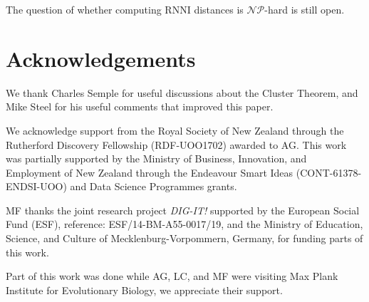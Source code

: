 \documentclass{amsart}
\newcommand{\np}{\mathcal{NP}}
\newcommand{\rnni}{\mathrm{RNNI}}
\begin{document}
The question of whether computing $\rnni$ distances is $\np$-hard is still open.


\section*{Acknowledgements}
We thank Charles Semple for useful discussions about the Cluster Theorem, and Mike Steel for his useful comments that improved this paper.

We acknowledge support from the Royal Society of New Zealand through the Rutherford Discovery Fellowship (RDF-UOO1702) awarded to AG.
This work was partially supported by the Ministry of Business, Innovation, and Employment of New Zealand through the Endeavour Smart Ideas (CONT-61378-ENDSI-UOO) and Data Science Programmes grants.

MF thanks the joint research project \textit{DIG-IT!} supported by the European Social Fund (ESF), reference: ESF/14-BM-A55-0017/19, and the Ministry of Education, Science, and Culture of Mecklenburg-Vorpommern, Germany, for funding parts of this work.

Part of this work was done while AG, LC, and MF were visiting Max Plank Institute for Evolutionary Biology, we appreciate their support.


\printbibliography
\end{document}
